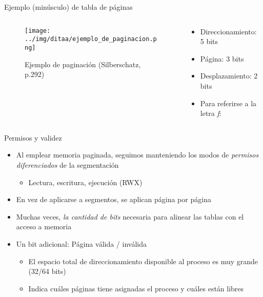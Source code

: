 \documentclass[presentation]{beamer}
\newcommand{\rarrow}{$\rightarrow$\hskip 0.5em}
\begin{document}
\begin{frame}[label={sec:orgfcbf1df}]{Ejemplo (minúsculo) de tabla de páginas}
\begin{columns}\begin{column}{0.5\textwidth}
\begin{figure}[htbp]
\centering
\texttt{[image: ../img/ditaa/ejemplo\_de\_paginacion.png]}
\caption{Ejemplo de paginación (Silberschatz, p.292)}
\end{figure}
\end{column}\begin{column}{0.5\textwidth}
\begin{itemize}
\item Direccionamiento: 5 bits
\item Página: 3 bits
\item Desplazamiento: 2 bits
\item Para referirse a la letra \emph{f}: \pause
{}
\end{itemize}
\end{column}\end{columns}
\end{frame}

\begin{frame}[label={sec:org0edfc72}]{Permisos y validez}
\begin{itemize}
\item Al emplear memoria paginada, seguimos manteniendo los modos de
\emph{permisos diferenciados} de la segmentación
\begin{itemize}
\item Lectura, escritura, ejecución (RWX)
\end{itemize}
\item En vez de aplicarse a segmentos, se aplican página por página
\item Muchas veces, \emph{la cantidad de bits} necesaria para alinear las
tablas con el acceso a memoria
\item Un bit adicional: Página válida / inválida
\begin{itemize}
\item El espacio total de direccionamiento disponible al proceso es muy
grande (32/64 bits)
\item Indica cuáles páginas tiene asignadas el proceso y cuáles están
libres
\end{itemize}
\end{itemize}
\end{frame}
\end{document}
